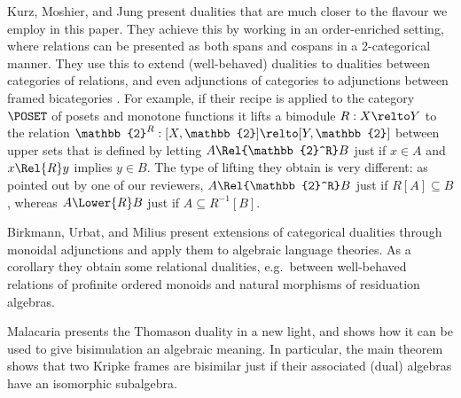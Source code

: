 \documentclass[a4paper,UKenglish,cleveref, autoref]{lipics-v2021}
\begin{document}
Kurz, Moshier, and Jung \cite{kurz_2023} present dualities that are
much closer to the flavour we employ in this paper. They achieve this
by working in an order-enriched setting, where relations can be
presented as both spans and cospans in a 2-categorical manner. They
use this to extend (well-behaved) dualities to dualities between
categories of relations, and even adjunctions of categories to
adjunctions between framed bicategories \cite{shulman_2008}. For
example, if their recipe is applied to the category $\POSET$ of posets
and monotone functions it lifts a bimodule $R : X \relto Y$ to the
relation $\mathbb{2}^R : [X, \mathbb{2}] \relto [Y, \mathbb{2}]$
between upper sets that is defined by letting $A \Rel{\mathbb{2}^R} B$
just if $x \in A$ and $x \Rel{R} y$ implies $y \in B$. The type of
lifting they obtain is very different: as pointed out by one of our
reviewers, $A \Rel{\mathbb{2}^R} B$ just if $R[A] \subseteq B$,
whereas $A \Lower{R} B$ just if $A \subseteq R^{-1}[B]$.

Birkmann, Urbat, and Milius \cite{birkmann_2024} present extensions of
categorical dualities through monoidal adjunctions and apply them to algebraic
language theories. As a corollary they obtain some relational dualities, e.g.\
between well-behaved relations of profinite ordered monoids and natural
morphisms of residuation algebras.

Malacaria \cite{malacaria_1995} presents the Thomason duality in a new light,
and shows how it can be used to give bisimulation an algebraic meaning. In
particular, the main theorem shows that two Kripke frames are bisimilar just if
their associated (dual) algebras have an isomorphic subalgebra.



\end{document}
